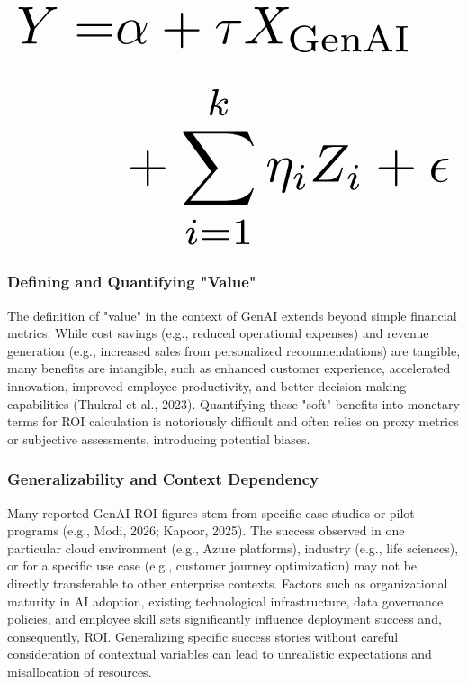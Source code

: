 \documentclass[10pt,journal,compsoc,twocolumn]{IEEEtran}
\begin{document}
\begin{equation}
\resizebox{\columnwidth}{!}{$\displaystyle
\begin{aligned}
Y = & \alpha + \tau X_{\text{GenAI}} \\
& + \sum_{i=1}^k \eta_i Z_i + \epsilon
\end{aligned}
$}
\end{equation}















































\subsubsection{Defining and Quantifying "Value"}

The definition of "value" in the context of GenAI extends beyond simple financial metrics. While cost savings (e.g., reduced operational expenses) and revenue generation (e.g., increased sales from personalized recommendations) are tangible, many benefits are intangible, such as enhanced customer experience, accelerated innovation, improved employee productivity, and better decision-making capabilities (Thukral et al., 2023). Quantifying these "soft" benefits into monetary terms for ROI calculation is notoriously difficult and often relies on proxy metrics or subjective assessments, introducing potential biases.


\subsubsection{Generalizability and Context Dependency}

Many reported GenAI ROI figures stem from specific case studies or pilot programs (e.g., Modi, 2026; Kapoor, 2025). The success observed in one particular cloud environment (e.g., Azure platforms), industry (e.g., life sciences), or for a specific use case (e.g., customer journey optimization) may not be directly transferable to other enterprise contexts. Factors such as organizational maturity in AI adoption, existing technological infrastructure, data governance policies, and employee skill sets significantly influence deployment success and, consequently, ROI. Generalizing specific success stories without careful consideration of contextual variables can lead to unrealistic expectations and misallocation of resources.
\end{document}
